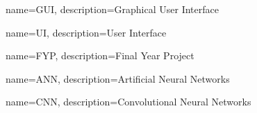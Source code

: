 {
        name=GUI,
        description={Graphical User Interface}
}

{
        name=UI,
        description={User Interface}
}

{
        name=FYP,
        description={Final Year Project}
}

{
        name=ANN,
        description={Artificial Neural Networks}
}

{
        name=CNN,
        description={Convolutional Neural Networks}
}



% 
